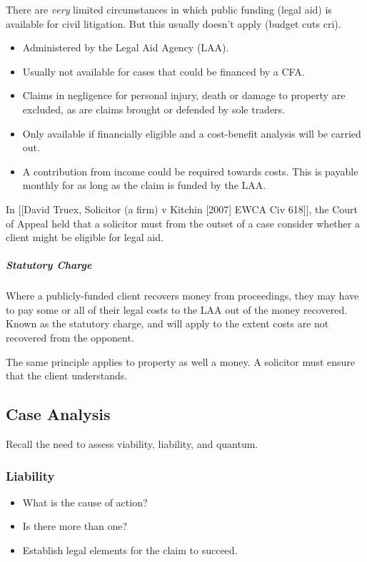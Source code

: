 \documentclass[
]{article}
\providecommand{\tightlist}{%
  \setlength{\itemsep}{0pt}\setlength{\parskip}{0pt}}
\begin{document}
There are \emph{very} limited circumstances in which public funding
(legal aid) is available for civil litigation. But this usually doesn't
apply (budget cuts cri).

\begin{itemize}
\tightlist
\item
  Administered by the Legal Aid Agency (LAA).
\item
  Usually not available for cases that could be financed by a CFA.
\item
  Claims in negligence for personal injury, death or damage to property
  are excluded, as are claims brought or defended by sole traders.
\item
  Only available if financially eligible and a cost-benefit analysis
  will be carried out.
\item
  A contribution from income could be required towards costs. This is
  payable monthly for as long as the claim is funded by the LAA.
\end{itemize}

In {[}{[}David Truex, Solicitor (a firm) v Kitchin {[}2007{]} EWCA Civ
618{]}{]}, the Court of Appeal held that a solicitor must from the
outset of a case consider whether a client might be eligible for legal
aid.

\hypertarget{statutory-charge}{%
\subparagraph{Statutory Charge}\label{statutory-charge}}

Where a publicly-funded client recovers money from proceedings, they may
have to pay some or all of their legal costs to the LAA out of the money
recovered. Known as the statutory charge, and will apply to the extent
costs are not recovered from the opponent.

The same principle applies to property as well a money. A solicitor must
ensure that the client understands.

\hypertarget{case-analysis-1}{%
\subsection{Case Analysis}\label{case-analysis-1}}

Recall the need to assess viability, liability, and quantum.

\hypertarget{liability}{%
\subsubsection{Liability}\label{liability}}

\begin{itemize}
\tightlist
\item
  What is the cause of action?
\item
  Is there more than one?
\item
  Establish legal elements for the claim to succeed.
\end{itemize}
\end{document}
